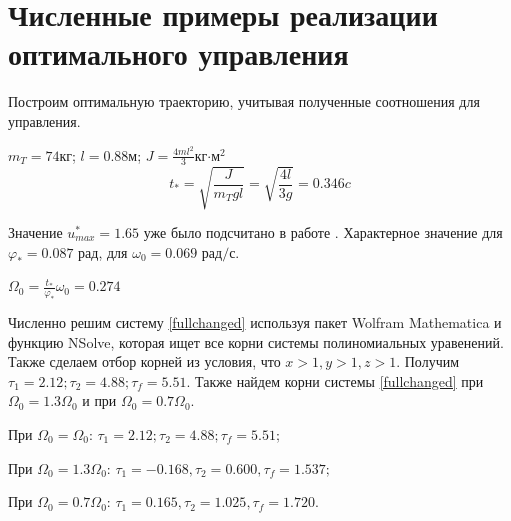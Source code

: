 \documentclass[a4paper,14pt]{article}
\theoremstyle{plain} %
\theoremstyle{definition} %
\theoremstyle{remark} %
\begin{document}
{\section{Численные примеры реализации оптимального управления}
Построим оптимальную траекторию, учитывая полученные соотношения для управления.

$m_T=74$кг; $l=0.88$м; $J=\frac{4ml^2}{3}$кг$\cdot$м$^2$
\[
    t_\ast=\sqrt{\frac{J}{m_Tgl}}=\sqrt{\frac{4l}{3g}}=0.346c
\]

Значение $u^*_{max}=1.65$ уже было подсчитано в работе \cite{kurscah}.
Характерное значение для $\varphi_\ast=0.087 \text{ рад}$, для $\omega_0=0.069 \text{ рад/с}$.

$\Omega_0=\frac{t_\ast}{\varphi_\ast}\omega_0=0.274$

Численно решим систему \eqref{fullchanged} используя пакет Wolfram Mathematica и
функцию NSolve, которая ищет все корни системы полиномиальных уравенений. Также сделаем отбор корней из условия, что $x>1,y>1,z>1$. Получим $\tau_1=2.12;\tau_2=4.88;\tau_f=5.51.$
Также найдем корни системы \eqref{fullchanged} при $\Omega_0=1.3\Omega_0$ и при $\Omega_0=0.7\Omega_0$.

При $\Omega_0=\Omega_0$: $\tau_1=2.12;\tau_2=4.88;\tau_f=5.51;$

При $\Omega_0=1.3\Omega_0$: $\tau_1=-0.168,\tau_2=0.600,\tau_f=1.537;$

При $\Omega_0=0.7\Omega_0$: $\tau_1=0.165,\tau_2=1.025,\tau_f=1.720.$

}
\end{document}
